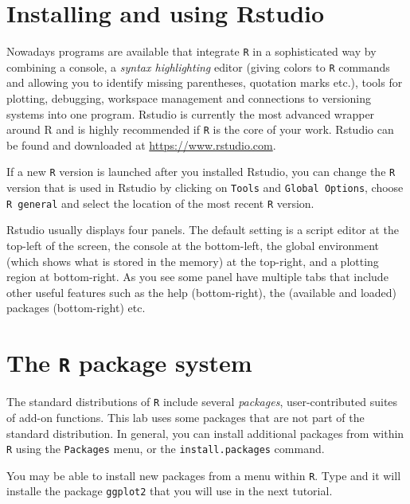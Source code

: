 \documentclass[11pt,]{article}
\begin{document}
\hypertarget{installing-and-using-rstudio}{%
\section{Installing and using Rstudio}\label{installing-and-using-rstudio}}

Nowadays programs are available that integrate \texttt{R} in a sophisticated way by combining a console, a \emph{syntax highlighting} editor (giving colors to \texttt{R} commands and allowing you to identify missing parentheses, quotation marks etc.), tools for plotting, debugging, workspace management and connections to versioning systems into one program. Rstudio is currently the most advanced wrapper around R and is highly recommended if \texttt{R} is the core of your work. Rstudio can be found and downloaded at \url{https://www.rstudio.com}.

If a new \texttt{R} version is launched after you installed Rstudio, you can change the \texttt{R} version that is used in Rstudio by clicking on \texttt{Tools} and \texttt{Global\ Options}, choose \texttt{R\ general} and select the location of the most recent \texttt{R} version.

Rstudio usually displays four panels. The default setting is a script editor at the top-left of the screen, the console at the bottom-left, the global environment (which shows what is stored in the memory) at the top-right, and a plotting region at bottom-right. As you see some panel have multiple tabs that include other useful features such as the help (bottom-right), the (available and loaded) packages (bottom-right) etc.

\hypertarget{the-r-package-system}{%
\section{\texorpdfstring{The \texttt{R} package system}{The R package system}}\label{the-r-package-system}}

The standard distributions of \texttt{R} include several \emph{packages}, user-contributed suites of add-on functions. This lab uses some packages that are not part of the standard distribution. In general, you can install additional packages
from within \texttt{R} using the \texttt{Packages} menu, or the \texttt{install.packages} command.

You may be able to install new packages from a menu within \texttt{R}. Type and it will installe the package \texttt{ggplot2} that you will use in the next tutorial.
\end{document}
